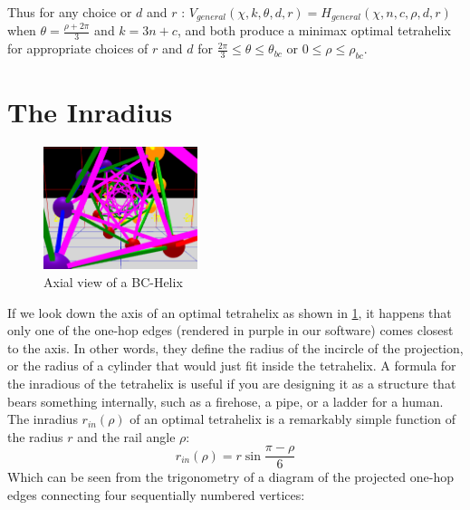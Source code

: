 \documentclass[review]{siamonline1116}
\begin{document}
Thus for any choice or $d$ and $r$ : $V_{general}(\chi,k,\theta,d,r) = H_{general}(\chi,n,c,\rho,d,r)$ when
$\theta = \frac{\rho+ 2\pi}{3}$ and $k = 3n + c$,
and both produce a minimax optimal tetrahelix for appropriate choices of $r$ and $d$ for
$\frac{2\pi}{3} \leq \theta \leq \theta_{bc}$ or $0 \leq \rho \leq \rho_{bc}$. 

\section{The Inradius}

\begin{figure}[H]
     \centering
     \includegraphics[width=0.4\textwidth]{figures/AxialView.png}
     \caption{Axial view of a BC-Helix}
  \label{axialview}     
\end{figure}


If we look down the axis of an optimal tetrahelix as shown in \cref{axialview}, it happens that only one of the one-hop edges
(rendered in purple in our software)
comes closest to the axis. In other words, they define the radius of the incircle of the
projection, or the radius of a cylinder that would just fit inside the tetrahelix.
A formula for the inradious of the tetrahelix is useful if you are designing it as a structure that bears something internally,
such as a firehose, a pipe, or
a ladder for a human. The inradius $r_{in}(\rho)$ of
an optimal tetrahelix is a remarkably simple function of the radius $r$ and the rail angle $\rho$:
\begin{equation}
  \label{eq:inradius}
  r_{in}(\rho) = r \sin{\frac{\pi - \rho}{6}}
\end{equation}
Which can be seen from the trigonometry of a diagram of the projected one-hop edges
connecting four sequentially numbered vertices:
\end{document}
